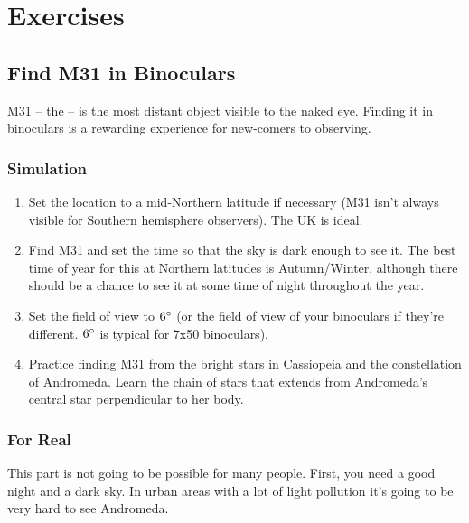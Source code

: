 
\chapter{Exercises}
\label{ch:Exercises}

\section{Find M31 in Binoculars}
\label{sec:Exercises:M31}

M31 -- the  -- is
the most distant object visible to the naked eye. Finding it in
binoculars is a rewarding experience for new-comers to observing.

\subsection{Simulation}

\begin{enumerate}
\item
  Set the location to a mid-Northern latitude if necessary (M31 isn't
  always visible for Southern hemisphere observers). The UK is ideal.
\item Find M31 and set the time so that the sky is dark enough to see
  it.  The best time of year for this at Northern latitudes is
  Autumn/Winter, although there should be a chance to see it at some
  time of night throughout the year.
\item Set the field of view to $6\degree$ (or the field of view of
  your binoculars if they're different. $6\degree$ is typical for 7x50
  binoculars).
\item Practice finding M31 from the bright stars in Cassiopeia and the
  constellation of Andromeda. Learn the chain of stars that extends
  from Andromeda's central star perpendicular to her body.
\end{enumerate}

\subsection{For Real}

This part is not going to be possible for many people. First, you need a
good night and a dark sky. In urban areas with a lot of light pollution
it's going to be very hard to see Andromeda.

